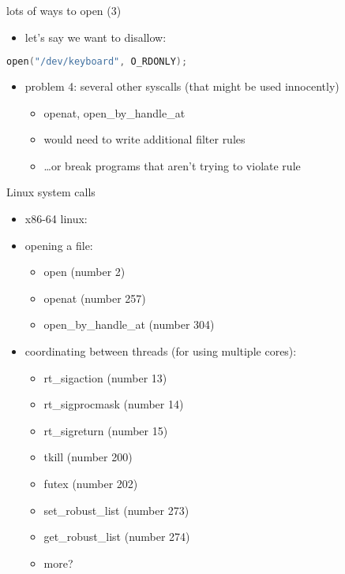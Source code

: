 \begin{frame}[fragile,label=openRuleP3]{lots of ways to open (3)}
\begin{itemize}
\item let's say we want to disallow:
\end{itemize}
\begin{lstlisting}[language=C,style=smaller]
open("/dev/keyboard", O_RDONLY);
\end{lstlisting}
\begin{itemize}
\item problem 4: several other syscalls (that might be used innocently)
    \begin{itemize}
    \item openat, open\_by\_handle\_at
    \item would need to write additional filter rules
    \item \ldots or break programs that aren't trying to violate rule
    \end{itemize}
\end{itemize}
\end{frame}

\begin{frame}[fragile,label=howManySystemCalls]{Linux system calls}
\begin{itemize}
\item x86-64 linux: 
\item opening a file:
    \begin{itemize}
    \item open (number 2)
    \item openat (number 257)
    \item open\_by\_handle\_at (number 304)
    \end{itemize}
\item coordinating between threads (for using multiple cores):
    \begin{itemize}
    \item rt\_sigaction (number 13)
    \item rt\_sigprocmask (number 14)
    \item rt\_sigreturn (number 15)
    \item tkill (number 200)
    \item futex (number 202)
    \item set\_robust\_list (number 273)
    \item get\_robust\_list (number 274)
    \item more?
    \end{itemize}
\end{itemize}
\end{frame}
